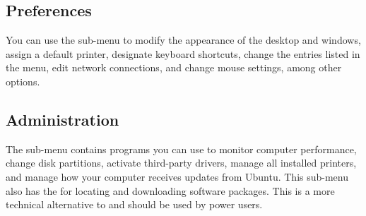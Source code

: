 \subsection{Preferences}
You can use the  sub-menu to modify the appearance of the desktop and windows,
assign a default printer, designate keyboard shortcuts, change the entries listed in the  menu, edit network connections, and change mouse settings, among other options.


\subsection{Administration}

The  sub-menu contains programs you can use to monitor computer performance,
change disk partitions, activate third-party drivers, manage all installed printers, and manage
how your computer receives updates from Ubuntu. This sub-menu also has the  for locating and downloading software packages. This is a more technical alternative to  and should be used by power users.

